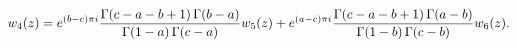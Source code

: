 \[w_{4}(z)=e^{(b-c)\pi i}\frac{\mathop{\Gamma\/}\nolimits\!\left(c-a-b+1\right)%
\mathop{\Gamma\/}\nolimits\!\left(b-a\right)}{\mathop{\Gamma\/}\nolimits\!%
\left(1-a\right)\mathop{\Gamma\/}\nolimits\!\left(c-a\right)}w_{5}(z)+e^{(a-c)%
\pi i}\frac{\mathop{\Gamma\/}\nolimits\!\left(c-a-b+1\right)\mathop{\Gamma\/}%
\nolimits\!\left(a-b\right)}{\mathop{\Gamma\/}\nolimits\!\left(1-b\right)%
\mathop{\Gamma\/}\nolimits\!\left(c-b\right)}w_{6}(z).\]